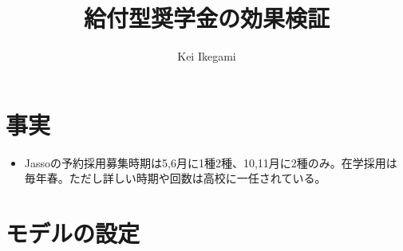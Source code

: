 \documentclass{jsarticle}
\begin{document}
\title{給付型奨学金の効果検証}
\author{Kei Ikegami}
\maketitle

\section{事実}
    \begin{itemize}
    	\item Jassoの予約採用募集時期は5,6月に1種2種、10,11月に2種のみ。在学採用は毎年春。ただし詳しい時期や回数は高校に一任されている。
    \end{itemize}
    
\section{モデルの設定}
\end{document}
